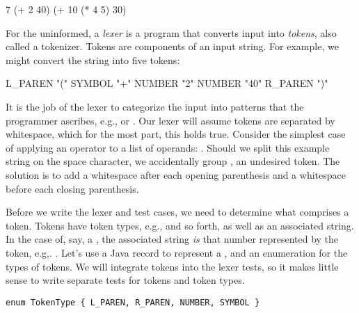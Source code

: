 \begin{verbnobox}[\small]
7
(+ 2 40)
(+ 10 (* 4 5) 30)
\end{verbnobox}

For the uninformed, a \emph{lexer} is a program that converts input into \emph{tokens}, also called a tokenizer. Tokens are components of an input string. For example, we might convert the string  into five tokens: 
\begin{verbnobox}[\small]
L_PAREN "("
SYMBOL "+"
NUMBER "2"
NUMBER "40"
R_PAREN ")"
\end{verbnobox}
It is the job of the lexer to categorize the input into patterns that the programmer ascribes, e.g.,  or . Our lexer will assume tokens are separated by whitespace, which for the most part, this holds true. Consider the simplest case of applying an operator to a list of operands: . Should we split this example string on the space character, we accidentally group , an undesired token. The solution is to add a whitespace after each opening parenthesis and a whitespace before each closing parenthesis. 

Before we write the lexer and test cases, we need to determine what comprises a token. Tokens have token types, e.g.,  and so forth, as well as an associated string. In the case of, say, a , the associated string \emph{is} that number represented by the token, e.g,. . Let's use a Java record to represent a , and an enumeration for the types of tokens. We will integrate tokens into the lexer tests, so it makes little sense to write separate tests for tokens and token types.

\begin{lstlisting}[language=MyJava]
enum TokenType { L_PAREN, R_PAREN, NUMBER, SYMBOL }
\end{lstlisting}

